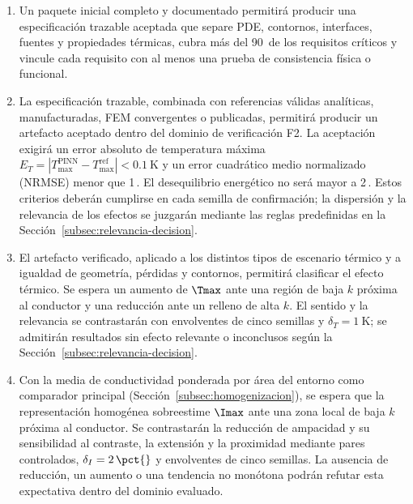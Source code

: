 \begin{enumerate}[label=HE\arabic*.]
  \item Un paquete inicial completo y documentado permitirá producir una especificación trazable aceptada que separe PDE, contornos, interfaces, fuentes y propiedades térmicas, cubra más del 90\,\pct{} de los requisitos críticos y vincule cada requisito con al menos una prueba de consistencia física o funcional.
  \item La especificación trazable, combinada con referencias válidas analíticas, manufacturadas, FEM convergentes o publicadas, permitirá producir un artefacto aceptado dentro del dominio de verificación F2. La aceptación exigirá un error absoluto de temperatura máxima $E_T=|T_{\max}^{\mathrm{PINN}}-T_{\max}^{\mathrm{ref}}|<\SI{0.1}{\kelvin}$ y un error cuadrático medio normalizado (NRMSE) menor que 1\,\pct{}. El desequilibrio energético no será mayor a 2\,\pct{}. Estos criterios deberán cumplirse en cada semilla de confirmación; la dispersión y la relevancia de los efectos se juzgarán mediante las reglas predefinidas en la Sección~\ref{subsec:relevancia-decision}.
  \item El artefacto verificado, aplicado a los distintos tipos de escenario térmico y a igualdad de geometría, pérdidas y contornos, permitirá clasificar el efecto térmico. Se espera un aumento de $\Tmax$ ante una región de baja $k$ próxima al conductor y una reducción ante un relleno de alta $k$. El sentido y la relevancia se contrastarán con envolventes de cinco semillas y $\delta_T=\SI{1}{\kelvin}$; se admitirán resultados sin efecto relevante o inconclusos según la Sección~\ref{subsec:relevancia-decision}.
  \item Con la media de conductividad ponderada por área del entorno como comparador principal (Sección~\ref{subsec:homogenizacion}), se espera que la representación homogénea sobreestime $\Imax$ ante una zona local de baja $k$ próxima al conductor. Se contrastarán la reducción de ampacidad y su sensibilidad al contraste, la extensión y la proximidad mediante pares controlados, $\delta_I=2\,\pct{}$ y envolventes de cinco semillas. La ausencia de reducción, un aumento o una tendencia no monótona podrán refutar esta expectativa dentro del dominio evaluado.
\end{enumerate}

